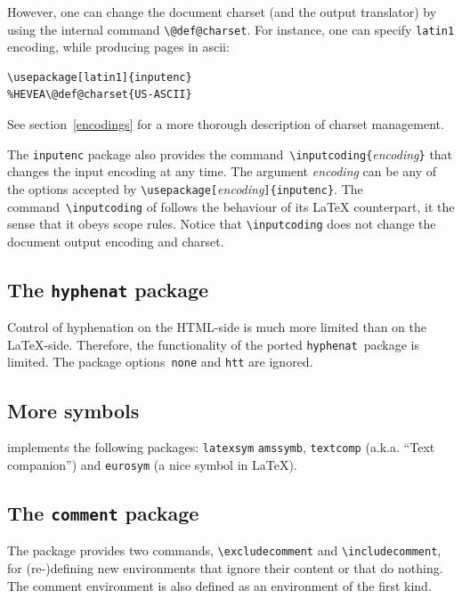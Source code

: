 However, one can change the document charset (and the output
translator) by using the internal command \verb+\@def@charset+.
For instance, one can specify \texttt{latin1} encoding, while
producing \html{} pages in ascii:
\begin{verbatim}
\usepackage[latin1]{inputenc}
%HEVEA\@def@charset{US-ASCII}
\end{verbatim}
See section~\ref{encodings} for a more thorough description of \html{}
charset management.

The \texttt{inputenc} package also provides the
command~\verb+\inputcoding{+\textit{encoding}\verb+}+ that
changes the input encoding at any time.
The argument \textit{encoding} can be any of the options accepted
by \verb+\usepackage[+\textit{encoding}\verb+]{inputenc}+.
The command~\verb+\inputcoding+ of \hevea{}
follows the behaviour of its \LaTeX{} counterpart, it the sense
that it obeys scope rules.
Notice that \verb+\inputcoding+ does not change the document output
encoding and charset.

\subsection{The \texttt{hyphenat} package}
Control of hyphenation on the HTML-side is much more limited than on
the \LaTeX-side.  Therefore, the functionality of the ported
\texttt{hyphenat}~package is limited.  The package options~\verb+none+
and \verb+htt+ are ignored.

\subsection{More symbols}
\hevea{} implements the following packages: \texttt{latexsym}
\texttt{amssymb}, \texttt{textcomp} (a.k.a. ``Text companion'')
and \texttt{eurosym} (a nice \texteuro{} symbol in \LaTeX).


\subsection{The \texttt{comment}\label{commentpack} package}
%
The  package provides two commands,
\verb+\excludecomment+ and \verb+\includecomment+, for (re-)defining
new environments that ignore their content or that do nothing. The
comment environment is also defined as an environment of the first
kind.



